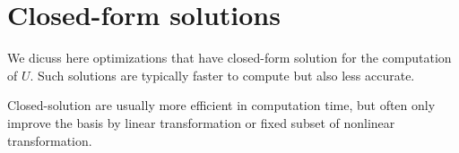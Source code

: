 \section{Closed-form solutions}
%
%
We dicuss here optimizations that have closed-form solution for the computation of $U$.
Such solutions are typically faster to compute but also less accurate.

Closed-solution are usually more efficient in computation time, but often only improve the basis by linear transformation or fixed subset of nonlinear transformation.
